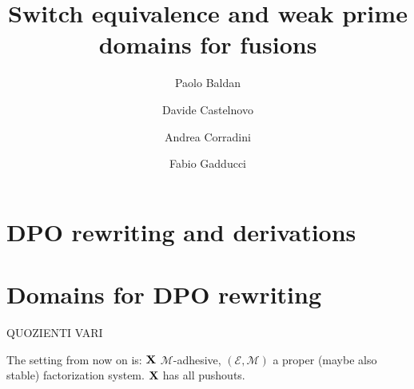 \documentclass[a4paper,twoside]{report}
\title{Switch equivalence and weak prime domains for fusions}
\author{Paolo Baldan\and Davide Castelnovo\and  Andrea Corradini\and Fabio Gadducci}
\def\X{\textbf {\textup{X}}}
\theoremstyle{definition}
\begin{document}
\maketitle




\tableofcontents







\part{DPO rewriting and derivations}

 


\part{Domains for DPO rewriting}






\iffalse 
\newpage
QUOZIENTI VARI

The setting from now on is: $\X$ $\mathcal{M}$-adhesive, $(\mathcal{E}, \mathcal{M})$ a proper (maybe also stable) factorization system. $\X$ has all pushouts.
\end{document}

